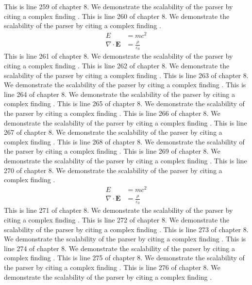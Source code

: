 This is line 259 of chapter 8. We demonstrate the scalability of the parser by citing a complex finding \cite{ref8_259}.
This is line 260 of chapter 8. We demonstrate the scalability of the parser by citing a complex finding \cite{ref8_260}.
\begin{align*}
  E &= mc^2 \\
  \nabla \cdot \mathbf{E} &= \frac{\rho}{\varepsilon_0}
\end{align*}
This is line 261 of chapter 8. We demonstrate the scalability of the parser by citing a complex finding \cite{ref8_261}.
This is line 262 of chapter 8. We demonstrate the scalability of the parser by citing a complex finding \cite{ref8_262}.
This is line 263 of chapter 8. We demonstrate the scalability of the parser by citing a complex finding \cite{ref8_263}.
This is line 264 of chapter 8. We demonstrate the scalability of the parser by citing a complex finding \cite{ref8_264}.
This is line 265 of chapter 8. We demonstrate the scalability of the parser by citing a complex finding \cite{ref8_265}.
This is line 266 of chapter 8. We demonstrate the scalability of the parser by citing a complex finding \cite{ref8_266}.
This is line 267 of chapter 8. We demonstrate the scalability of the parser by citing a complex finding \cite{ref8_267}.
This is line 268 of chapter 8. We demonstrate the scalability of the parser by citing a complex finding \cite{ref8_268}.
This is line 269 of chapter 8. We demonstrate the scalability of the parser by citing a complex finding \cite{ref8_269}.
This is line 270 of chapter 8. We demonstrate the scalability of the parser by citing a complex finding \cite{ref8_270}.
\begin{align*}
  E &= mc^2 \\
  \nabla \cdot \mathbf{E} &= \frac{\rho}{\varepsilon_0}
\end{align*}
This is line 271 of chapter 8. We demonstrate the scalability of the parser by citing a complex finding \cite{ref8_271}.
This is line 272 of chapter 8. We demonstrate the scalability of the parser by citing a complex finding \cite{ref8_272}.
This is line 273 of chapter 8. We demonstrate the scalability of the parser by citing a complex finding \cite{ref8_273}.
This is line 274 of chapter 8. We demonstrate the scalability of the parser by citing a complex finding \cite{ref8_274}.
This is line 275 of chapter 8. We demonstrate the scalability of the parser by citing a complex finding \cite{ref8_275}.
This is line 276 of chapter 8. We demonstrate the scalability of the parser by citing a complex finding \cite{ref8_276}.
